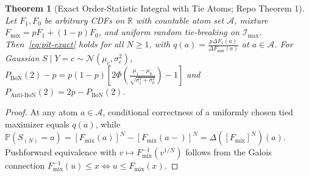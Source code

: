 \documentclass{article}
\theoremstyle{plain}
\newtheorem{theorem}{Theorem}
\theoremstyle{definition}
\theoremstyle{remark}
\newcommand{\R}{\mathbb{R}}
\newcommand{\Prob}{\mathbb{P}}
\newcommand{\Fmix}{F_{\mathrm{mix}}}
\begin{document}
\begin{theorem}[Exact Order-Statistic Integral with Tie Atoms; Repo Theorem 1]
\label{thm:app-pit}
Let $F_1, F_0$ be arbitrary CDFs on $\R$ with countable atom set $\mathcal{A}$, mixture $\Fmix = p F_1 + (1-p)F_0$, and uniform random tie-breaking on $\mathcal{I}_{\max}$. Then~\eqref{eq:pit-exact} holds for all $N \ge 1$, with $q(a) = \frac{p\Delta F_1(a)}{\Delta\Fmix(a)}$ at $a \in \mathcal{A}$. For Gaussian $S \mid Y=c \sim \mathcal{N}(\mu_c, \sigma_c^2)$, $P_{\mathrm{BoN}}(2) - p = p(1-p)[2\Phi(\frac{\mu_1-\mu_0}{\sqrt{\sigma_1^2+\sigma_0^2}}) - 1]$ and $P_{\mathrm{Anti\text{-}BoN}}(2) = 2p - P_{\mathrm{BoN}}(2)$.
\end{theorem}
\begin{proof}
At any atom $a \in \mathcal{A}$, conditional correctness of a uniformly chosen tied maximizer equals $q(a)$, while $\Prob(S_{(N)} = a) = [\Fmix(a)]^N - [\Fmix(a-)]^N = \Delta([\Fmix]^N)(a)$. Pushforward equivalence with $v \mapsto \Fmix^{-1}(v^{1/N})$ follows from the Galois connection $\Fmix^{-1}(u) \le x \iff u \le \Fmix(x)$.
\end{proof}
\end{document}
